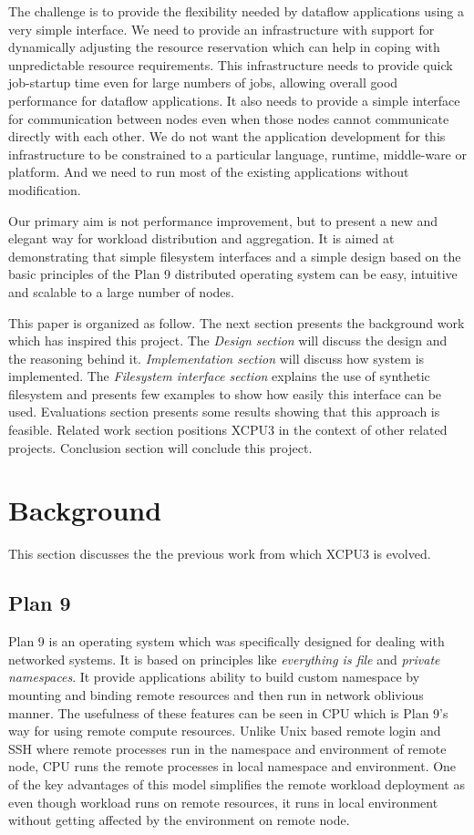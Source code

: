 \documentclass{sig-alternate}
\begin{document}
The challenge is to provide the flexibility needed by dataflow applications
using a very simple interface.  We need to provide an infrastructure with
support for dynamically adjusting the resource reservation which can help in
coping with unpredictable resource requirements.  This infrastructure needs to
provide quick job-startup time even for large numbers of jobs, allowing overall
good performance for dataflow applications.  It also needs to provide a simple
interface for communication between nodes even when those nodes cannot
communicate directly with each other. We do not want the application development
for this infrastructure to be constrained to a particular language, runtime,
middle-ware or platform.  And we need to run most of the existing applications
without modification.


Our primary aim is not performance improvement, but to present a new and elegant
way for workload distribution and aggregation.  It is aimed at demonstrating
that simple filesystem interfaces and a simple design based on the basic
principles of the Plan 9 \cite{pike95plan} distributed operating system can be
easy, intuitive and scalable to a large number of nodes.

This paper is organized as follow. The next section presents the background
work which has inspired this project. The \textit{Design section} will discuss
the design and the reasoning behind it. \textit{Implementation section} will
discuss how system is implemented. The \textit{Filesystem interface section}
explains the use of synthetic filesystem and presents few examples to show how
easily this interface can be used. Evaluations section presents some results
showing that this approach is feasible. Related work section positions XCPU3 in
the context of other related projects. Conclusion section will conclude this
project.

\section{Background}
This section discusses the the previous work from which XCPU3 is evolved.

\subsection{Plan 9}
Plan 9 is an operating system which was specifically designed for dealing with
networked systems.  It is based on principles like \textit{everything is file}
and \textit{private namespaces}\cite{namespace}.  It provide applications
ability to build custom namespace by mounting and binding remote resources and
then run in network oblivious manner.  The usefulness of these features can be
seen in CPU\cite{plan9-cpu} which is Plan 9's way for using remote compute
resources.  Unlike Unix based remote login and SSH where remote processes run
in the namespace and environment of remote node, CPU runs the remote processes
in local namespace and environment.  One of the key advantages of this model
simplifies the remote workload deployment as even though workload runs on
remote resources, it runs in local environment without getting affected by the
environment on remote node.
\end{document}
